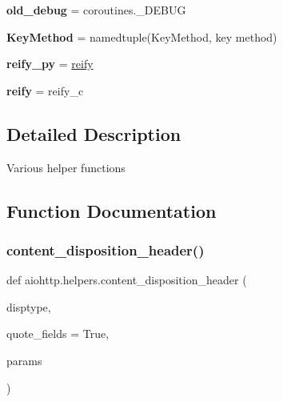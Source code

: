 \begin{DoxyCompactItemize}
\mbox{\label{namespaceaiohttp_1_1helpers_abcad7db635bfbd2e1f640f8f2b254005}} 
{\bfseries old\+\_\+debug} = coroutines.\+\_\+\+D\+E\+B\+UG
\item 
\mbox{\label{namespaceaiohttp_1_1helpers_a60f76e72edb02a0b12fbdaed41abcd9d}} 
{\bfseries Key\+Method} = namedtuple(\textquotesingle{}Key\+Method\textquotesingle{}, \textquotesingle{}key method\textquotesingle{})
\item 
\mbox{\label{namespaceaiohttp_1_1helpers_ab43a4b09c6801b2acf57e7621db33436}} 
{\bfseries reify\+\_\+py} = \hyperlink{classaiohttp_1_1helpers_1_1reify}{reify}
\item 
\mbox{\label{namespaceaiohttp_1_1helpers_a5e48e6a36653bd0cd88eb32d0b628116}} 
{\bfseries reify} = reify\+\_\+c
\end{DoxyCompactItemize}


\subsection{Detailed Description}
\begin{DoxyVerb}Various helper functions\end{DoxyVerb}
 

\subsection{Function Documentation}
\mbox{\label{namespaceaiohttp_1_1helpers_a73b9c9ecada3678e1626107a082b2728}} 
\subsubsection{\texorpdfstring{content\+\_\+disposition\+\_\+header()}{content\_disposition\_header()}}
{\footnotesize\ttfamily def aiohttp.\+helpers.\+content\+\_\+disposition\+\_\+header (\begin{DoxyParamCaption}\item[{}]{disptype,  }\item[{}]{quote\+\_\+fields = {\ttfamily True},  }\item[{}]{params }\end{DoxyParamCaption})}

